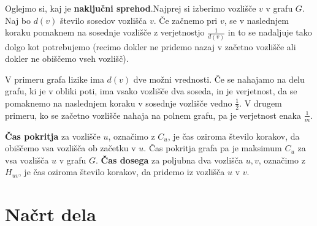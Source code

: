 \documentclass[12pt,a4paper]{amsart}
\begin{document}

Oglejmo si, kaj je \textbf{naključni sprehod}.Najprej si izberimo vozlišče $v$ v grafu $G$. Naj bo $d(v)$ število sosedov
 vozlišča $v$. Če začnemo pri $v$, se v naslednjem koraku pomaknem na 
sosednje vozlišče z verjetnostjo $\frac{1}{d(v)}$ in to se nadaljuje tako dolgo kot potrebujemo 
(recimo dokler ne pridemo nazaj v začetno vozlišče ali dokler ne obiščemo vseh vozlišč).

V primeru grafa lizike ima $d(v)$ dve možni vrednosti. Če se nahajamo na
delu grafu, ki je v obliki poti, ima vsako vozlišče dva soseda, in je verjetnost, da
se pomaknemo na naslednjem koraku v sosednje vozlišče vedno $\frac{1}{2}$. V drugem primeru, ko se začetno vozlišče nahaja na
polnem grafu, pa je verjetnost enaka $\frac{1}{m}$. 

\textbf{Čas pokritja} za vozlišče $u$, označimo z $C_u$, je čas oziroma število korakov, da obiščemo vsa vozlišča ob začetku v $u$.
Čas pokritja grafa pa je maksimum $C_u$ za vsa vozlišča $u$ v grafu $G$.
\textbf{Čas dosega} za poljubna dva vozlišča $u,v$, označimo z $H_{uv}$, je čas oziroma število korakov, da 
pridemo iz vozlišča $u$ v $v$.


\section{Načrt dela}
\end{document}

